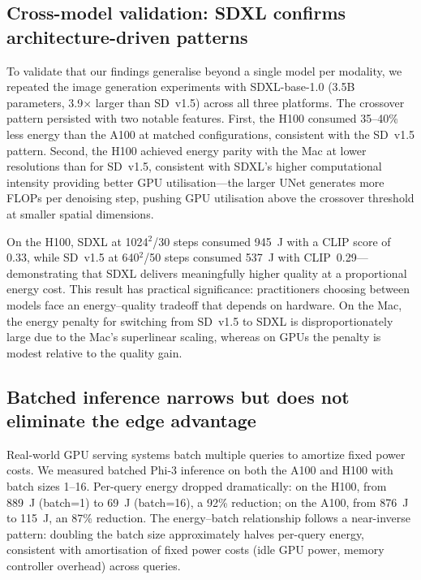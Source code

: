 \documentclass[11pt]{article}
\begin{document}
\subsection{Cross-model validation: SDXL confirms architecture-driven patterns}

To validate that our findings generalise beyond a single model per modality, we repeated the image generation experiments with SDXL-base-1.0\cite{podell2023sdxl} (3.5B parameters, 3.9$\times$ larger than SD~v1.5) across all three platforms. The crossover pattern persisted with two notable features. First, the H100 consumed 35--40\% less energy than the A100 at matched configurations, consistent with the SD~v1.5 pattern. Second, the H100 achieved energy parity with the Mac at lower resolutions than for SD~v1.5, consistent with SDXL's higher computational intensity providing better GPU utilisation---the larger UNet generates more FLOPs per denoising step, pushing GPU utilisation above the crossover threshold at smaller spatial dimensions.

On the H100, SDXL at 1024$^2$/30 steps consumed 945~J with a CLIP score of 0.33, while SD~v1.5 at 640$^2$/50 steps consumed 537~J with CLIP~0.29---demonstrating that SDXL delivers meaningfully higher quality at a proportional energy cost. This result has practical significance: practitioners choosing between models face an energy--quality tradeoff that depends on hardware. On the Mac, the energy penalty for switching from SD~v1.5 to SDXL is disproportionately large due to the Mac's superlinear scaling, whereas on GPUs the penalty is modest relative to the quality gain.

\subsection{Batched inference narrows but does not eliminate the edge advantage}
\label{sec:batched}

Real-world GPU serving systems batch multiple queries to amortize fixed power costs. We measured batched Phi-3 inference on both the A100 and H100 with batch sizes 1--16. Per-query energy dropped dramatically: on the H100, from 889~J (batch=1) to 69~J (batch=16), a 92\% reduction; on the A100, from 876~J to 115~J, an 87\% reduction. The energy--batch relationship follows a near-inverse pattern: doubling the batch size approximately halves per-query energy, consistent with amortisation of fixed power costs (idle GPU power, memory controller overhead) across queries.
\end{document}
